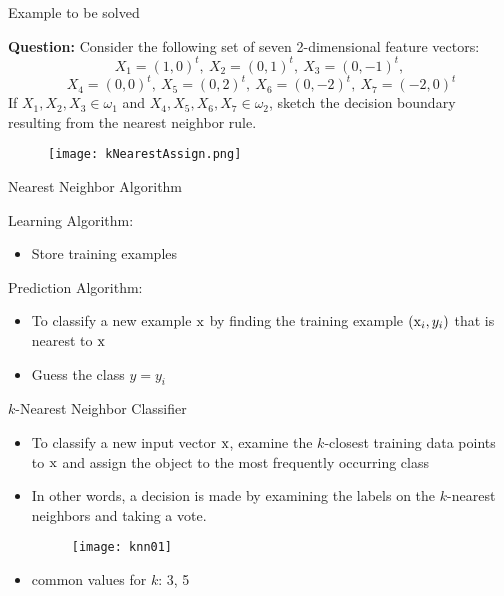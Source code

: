 \begin{frame}{Example to be solved}

{\bf \color{mycolor2}Question:} Consider the following set of seven 2-dimensional feature vectors:
\begin{equation}
X_1=(1,0)^t,~X_2=(0,1)^t,~X_3=(0,-1)^t, \nonumber
\end{equation}
\begin{equation}
 ~X_4=(0,0)^t,~X_5=(0,2)^t,~X_6=(0,-2)^t, ~X_7=(-2,0)^t\nonumber
\end{equation}
If $X_1,X_2,X_3\in \omega_1$ and $X_4,X_5,X_6,X_7\in \omega_2$, sketch the decision boundary resulting from the nearest neighbor rule.
\begin{figure}
\texttt{[image: kNearestAssign.png]}
\end{figure}
\end{frame}

\begin{frame}{Nearest Neighbor Algorithm}

{\color{mycolor2}Learning Algorithm:}
\begin{itemize}
\item Store training examples
\end{itemize}
{\color{mycolor2}Prediction Algorithm:}
\begin{itemize}
\item To classify a new example ${\rm x}$ by finding the training example $({\rm x}_i,y_i)$ that is nearest to ${\rm x}$
\item Guess the class $y =y_i$
\end{itemize}
\end{frame}

\begin{frame}{$k$-Nearest Neighbor Classifier}
\begin{itemize}
\item To classify a new input vector ${\rm x}$, examine the $k$-closest training data points to ${\rm x}$ and assign the object to the most frequently occurring class
\item In other words, a decision is made by examining the labels on the $k$-nearest neighbors and taking a vote.
\begin{figure}
\texttt{[image: knn01]}
\end{figure}
\item common values for $k$: 3, 5
\end{itemize}
\end{frame}



